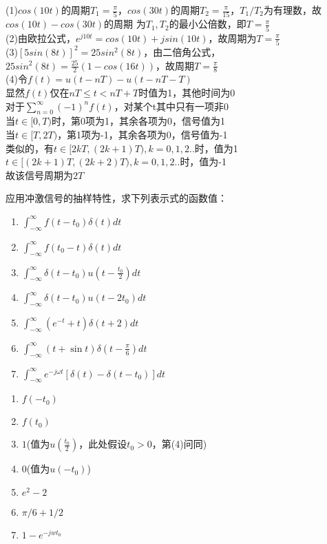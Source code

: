 \documentclass[answers]{exam}
\begin{document}
\begin{questions}
\begin{solution}
	(1)$cos(10t)$的周期$T_1=\frac{\pi}{5}$，$cos(30t)$的周期$T_2=\frac{\pi}{15}$，$T_1/T_2$为有理数，故$cos(10t)-cos(30t)$的周期
	为$T_1,T_2$的最小公倍数，即$T=\frac{\pi}{5}$\\

	(2)由欧拉公式，$e^{j10t}=cos(10t)+jsin(10t)$，故周期为$T=\frac{\pi}{5}$\\

	(3)$[5sin(8t)]^2=25sin^2(8t)$，由二倍角公式，\\
	$25sin^2(8t)=\frac{25}{2}(1-cos(16t))$，故周期$T=\frac{\pi}{8}$\\

	(4)令$f(t)=u(t-nT)-u(t-nT-T)$\\

	显然$f(t)\mbox{仅在}nT\leq t<nT+T$时值为1，其他时间为0\\

	对于$\sum_{n=0}^{\infty}(-1)^nf(t)$，对某个t其中只有一项非0\\

	当$t\in[0,T)$时，第0项为1，其余各项为0，信号值为1\\
	当$t\in[T,2T)$，第1项为-1，其余各项为0，信号值为-1\\
	类似的，有$t\in[2kT,(2k+1)T),k=0,1,2..$时，值为1\\
	$t\in[(2k+1)T,(2k+2)T),k=0,1,2..$时，值为-1\\
	故该信号周期为$2T$
\end{solution}



\question 应用冲激信号的抽样特性，求下列表示式的函数值：
\begin{enumerate}[(1)]
	\item $\int_{-\infty}^{\infty} f(t-t_0)\delta(t) dt$
	\item $\int_{-\infty}^{\infty} f(t_0-t)\delta(t) dt$
	\item $\int_{-\infty}^{\infty} \delta(t-t_0)u(t-\frac{t_0}{2}) dt$
	\item $\int_{-\infty}^{\infty} \delta(t-t_0)u(t-2t_0) dt$
	\item $\int_{-\infty}^{\infty} (e^{-t}+t)\delta(t+2) dt$
	\item $\int_{-\infty}^{\infty} (t+\sin t)\delta(t-\frac{\pi}{6}) dt$
	\item $\int_{-\infty}^{\infty} e^{-j\omega t}\left[ \delta(t)-\delta(t-t_0)\right] dt$
\end{enumerate}

\begin{solution}
\begin{enumerate}[(1)]
	\item $f(-t_0)$
	\item $f(t_0)$
	\item $1$(值为$u(\frac{t_0}{2})$，此处假设$t_0>0$，第(4)问同)
	\item $0$(值为$u(-t_0)$)
	\item $e^2-2$
	\item $\pi/6+1/2$
	\item $1-e^{-jwt_0}$
\end{enumerate}
\end{solution}




\end{questions}
\end{document}
